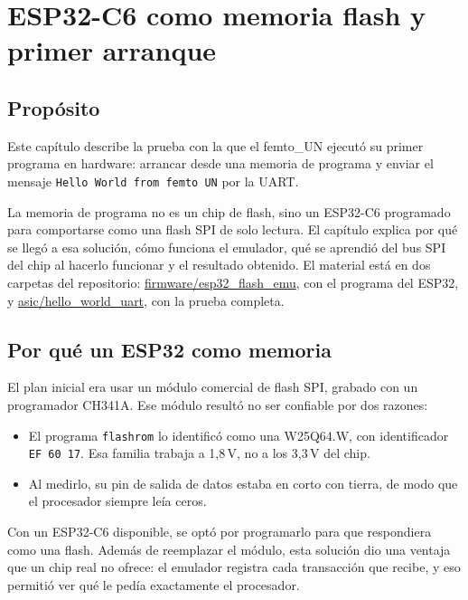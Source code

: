 \documentclass[11pt,letterpaper,oneside]{report}
\newcommand{\code}[1]{\texttt{#1}}
\newcommand{\repo}{https://github.com/SebastianRodriguez05/risc-v-manizales/tree/main}
\begin{document}
\chapter{ESP32-C6 como memoria flash y primer arranque}
\label{cap:flash}

\section{Propósito}

Este capítulo describe la prueba con la que el femto\_UN ejecutó su primer programa en hardware: arrancar desde una memoria de programa y enviar el mensaje \code{Hello World from femto UN} por la UART.

La memoria de programa no es un chip de flash, sino un ESP32-C6 programado para comportarse como una flash SPI de solo lectura. El capítulo explica por qué se llegó a esa solución, cómo funciona el emulador, qué se aprendió del bus SPI del chip al hacerlo funcionar y el resultado obtenido. El material está en dos carpetas del repositorio: \href{\repo/firmware/esp32_flash_emu}{firmware/esp32\_flash\_emu}, con el programa del ESP32, y \href{\repo/asic/hello_world_uart}{asic/hello\_world\_uart}, con la prueba completa.

\section{Por qué un ESP32 como memoria}

El plan inicial era usar un módulo comercial de flash SPI, grabado con un programador CH341A. Ese módulo resultó no ser confiable por dos razones:

\begin{itemize}
  \item El programa \code{flashrom} lo identificó como una W25Q64.W, con identificador \code{EF 60 17}. Esa familia trabaja a 1,8\,V, no a los 3,3\,V del chip.
  \item Al medirlo, su pin de salida de datos estaba en corto con tierra, de modo que el procesador siempre leía ceros.
\end{itemize}

Con un ESP32-C6 disponible, se optó por programarlo para que respondiera como una flash. Además de reemplazar el módulo, esta solución dio una ventaja que un chip real no ofrece: el emulador registra cada transacción que recibe, y eso permitió ver qué le pedía exactamente el procesador.
\end{document}
